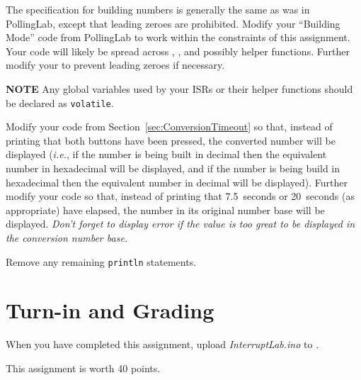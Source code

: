 The specification for building numbers is generally the same as was in
PollingLab, except that leading zeroes are prohibited. Modify your ``Building
Mode'' code from PollingLab to work within the constraints of this assignment.
Your code will likely be spread across ,
, and possibly helper functions. Further modify
your to prevent leading zeroes if necessary.

\textbf{NOTE} Any global variables used by your ISRs or their helper functions
should be declared as \lstinline{volatile}.

Modify your code from Section~\ref{sec:ConversionTimeout} so that, instead of
printing that both buttons have been pressed, the converted number will be
displayed (\textit{i.e.}, if the number is being built in decimal then the
equivalent number in hexadecimal will be displayed, and if the number is being
build in hexadecimal then the equivalent number in decimal will be displayed).
Further modify your code so that, instead of printing that 7.5~seconds or
20~seconds (as appropriate) have elapsed, the number in its original number base
will be displayed. \textit{Don't forget to display {\dviiseg error} if the value
is too great to be displayed in the conversion number base.}

Remove any remaining \lstinline{println} statements.

\section*{Turn-in and Grading}

When you have completed this assignment, upload \textit{InterruptLab.ino} to
\filesubmission.

This assignment is worth 40 points. \\

